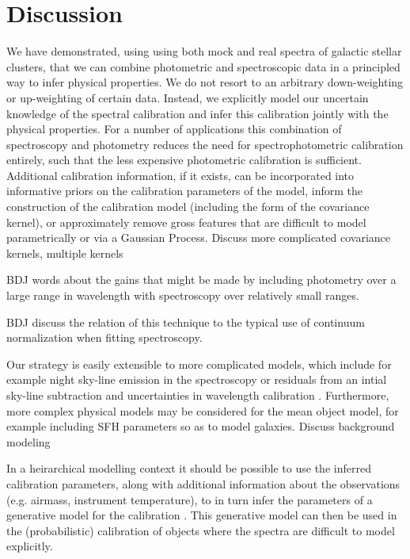 \documentclass[iop,numberedappendix]{emulateapj}
\begin{document}
\section{Discussion}

We have demonstrated, using using both mock and real spectra of
galactic stellar clusters, that we can combine photometric and
spectroscopic data in a principled way to infer physical properties.
We do not resort to an arbitrary down-weighting or up-weighting of
certain data. Instead, we explicitly model our uncertain knowledge of
the spectral calibration and infer this calibration jointly with the
physical properties. For a number of applications this combination of
spectroscopy and photometry reduces the need for spectrophotometric
calibration entirely, such that the less expensive photometric
calibration is sufficient.  Additional calibration information, if it
exists, can be incorporated into informative priors on the calibration
parameters of the model, inform the construction of the calibration
model (including the form of the covariance kernel), or approximately
remove gross features that are difficult to model parametrically or
via a Gaussian Process.  {\color{blue} Discuss more complicated
covariance kernels, multiple kernels}

{\color{blue} BDJ words about the gains that might be made by
including photometry over a large range in wavelength with spectroscopy
over relatively small ranges.}

{\color{blue} BDJ discuss the relation of this technique to the typical use of
continuum normalization when fitting spectroscopy.}

Our strategy is easily extensible to more complicated models, which
include for example night sky-line emission in the spectroscopy
\citep[e.g.,][]{gullikson14} or residuals from an intial sky-line
subtraction and uncertainties in wavelength calibration
\citep[e.g.,][]{walker15}. Furthermore, more complex physical models
may be considered for the mean object model, for example including SFH
parameters so as to model galaxies. {\color{blue} Discuss background
modeling}

In a heirarchical modelling context it should be possible to use the
inferred calibration parameters, along with additional information
about the observations (e.g. airmass, instrument temperature), to in
turn infer the parameters of a generative model for the calibration
\citep[e.g.][]{spectrophot}. This generative model can then be used in
the (probabilistic) calibration of objects where the spectra are
difficult to model explicitly.
\end{document}
